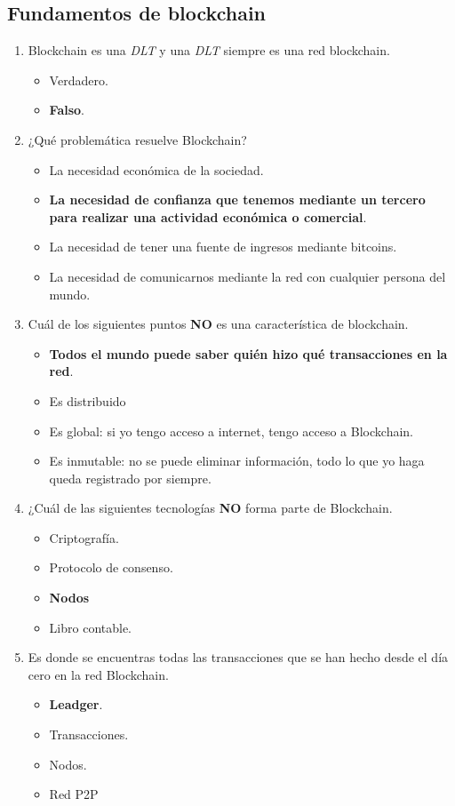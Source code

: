 \documentclass[a4paper,12pt]{/home/armando/Documentos/Cursos/LaTeX/Plantillas/lib/pub}
\begin{document}
\subsection{Fundamentos de blockchain}
\begin{enumerate}
	\item Blockchain es una \textit{DLT} y una \textit{DLT} siempre es una red blockchain.
	\begin{itemize}
		\item Verdadero.
		\item \textbf{Falso}.
	\end{itemize}
	\item ¿Qué problemática resuelve Blockchain?
	\begin{itemize}
		\item La necesidad económica de la sociedad.
		\item \textbf{La necesidad de confianza que tenemos mediante un tercero para realizar una actividad económica o comercial}.
		\item La necesidad de tener una fuente de ingresos mediante bitcoins.
		\item La necesidad de comunicarnos mediante la red con cualquier persona del mundo.
	\end{itemize}
	\item Cuál de los siguientes puntos \textbf{NO} es una característica de blockchain.
	\begin{itemize}
		\item \textbf{Todos el mundo puede saber quién hizo qué transacciones en la red}.
		\item Es distribuido
		\item Es global: si yo tengo acceso a internet, tengo acceso a Blockchain.
		\item Es inmutable: no se puede eliminar información, todo lo que yo haga queda registrado por siempre.
	\end{itemize}
	\item ¿Cuál de las siguientes tecnologías \textbf{NO} forma parte de Blockchain.
	\begin{itemize}
		\item Criptografía.
		\item Protocolo de consenso.
		\item \textbf{Nodos}
		\item Libro contable.
	\end{itemize}
	\item Es donde se encuentras todas las transacciones que se han hecho desde el día cero en la red Blockchain.
	\begin{itemize}
		\item \textbf{Leadger}.
		\item Transacciones.
		\item Nodos.
		\item Red P2P
	\end{itemize}
\end{enumerate}
\end{document}
